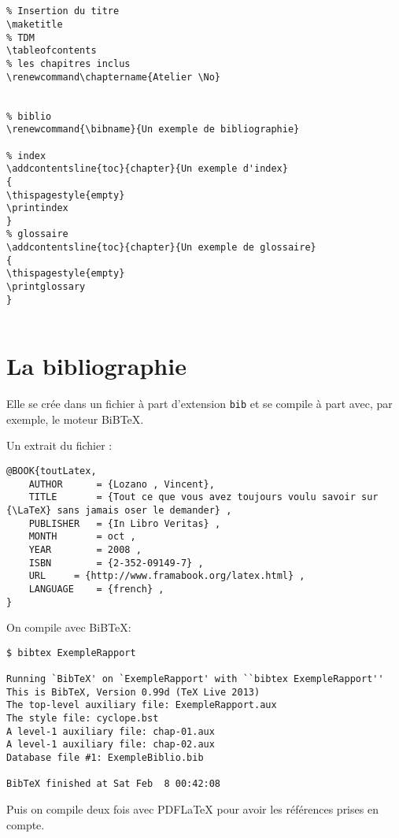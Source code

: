 \begin{lstlisting}


% Insertion du titre
\maketitle
% TDM
\tableofcontents
% les chapitres inclus
\renewcommand\chaptername{Atelier \No}


% biblio  
\renewcommand{\bibname}{Un exemple de bibliographie}

% index
\addcontentsline{toc}{chapter}{Un exemple d'index}
{
\thispagestyle{empty}
\printindex
}
% glossaire
\addcontentsline{toc}{chapter}{Un exemple de glossaire}
{
\thispagestyle{empty}
\printglossary
}


\end{lstlisting}

\section{La bibliographie}

Elle se crée dans un fichier à  part d'extension \verb+bib+ et se compile à part
avec, par exemple, le moteur BiB\TeX{}.


Un extrait du fichier :

\begin{lstlisting}
@BOOK{toutLatex, 
	AUTHOR		= {Lozano , Vincent},
	TITLE		= {Tout ce que vous avez toujours voulu savoir sur {\LaTeX} sans jamais oser le demander} ,
	PUBLISHER	= {In Libro Veritas} ,
	MONTH		= oct ,
	YEAR		= 2008 ,
	ISBN		= {2-352-09149-7} ,
	URL		= {http://www.framabook.org/latex.html} ,
	LANGUAGE	= {french} ,
}
\end{lstlisting}


\shell

On compile avec BiB\TeX{}:

\begin{lstlisting}
$ bibtex ExempleRapport

Running `BibTeX' on `ExempleRapport' with ``bibtex ExempleRapport''
This is BibTeX, Version 0.99d (TeX Live 2013)
The top-level auxiliary file: ExempleRapport.aux
The style file: cyclope.bst
A level-1 auxiliary file: chap-01.aux
A level-1 auxiliary file: chap-02.aux
Database file #1: ExempleBiblio.bib

BibTeX finished at Sat Feb  8 00:42:08
\end{lstlisting}

Puis on compile  deux fois avec PDF\LaTeX{} pour avoir  les références prises en
compte.

